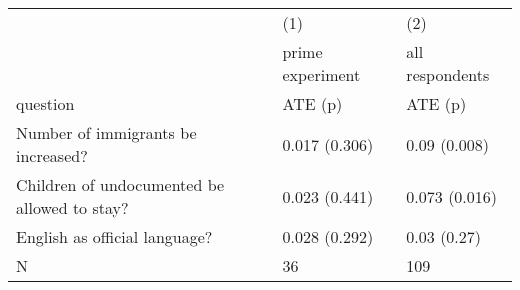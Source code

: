 \begin{tabular}{lll}
  \hline
  \hline
 & (1) & (2) \\ 
   & prime experiment & all respondents \\ 
  question & ATE (p) & ATE (p) \\ 
  Number of immigrants be increased? & 0.017 (0.306) & 0.09 (0.008) \\ 
  Children of undocumented be allowed to stay? & 0.023 (0.441) & 0.073 (0.016) \\ 
  English as official language? & 0.028 (0.292) & 0.03 (0.27) \\ 
  N & 36 & 109 \\ 
   \hline
\end{tabular}
